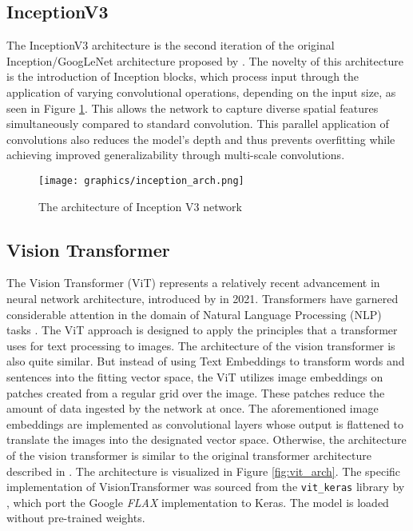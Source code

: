 \documentclass[draft,final]{vutinfth} %
\begin{document}
\subsection{InceptionV3} \label{sec:meth_disease_inception}
The InceptionV3 architecture is the second iteration of the original Inception/GoogLeNet architecture proposed by \citeauthor{szegedy_going_2014} \cite{szegedy_going_2014}. The novelty of this architecture is the introduction of Inception blocks, which process input through the application of varying convolutional operations, depending on the input size, as seen in Figure \ref{fig:inception_arch}. This allows the network to capture diverse spatial features simultaneously compared to standard convolution. This parallel application of convolutions also reduces the model's depth and thus prevents overfitting while achieving improved generalizability through multi-scale convolutions. 

\begin{figure}
    \centering
    \texttt{[image: graphics/inception\_arch.png]}
    \caption{The architecture of Inception V3 network \cite{iparraguirre-villanueva_convolutional_2022}}
    \label{fig:inception_arch}
\end{figure}

\subsection{Vision Transformer} \label{sec:method_vit}
The Vision Transformer (ViT) represents a relatively recent advancement in neural network architecture, introduced by \citeauthor{dosovitskiy_image_2021} in 2021. Transformers have garnered considerable attention in the domain of Natural Language Processing (NLP) tasks \cite{vaswani_attention_2023}. 
The ViT approach is designed to apply the principles that a transformer uses for text processing to images. The architecture of the vision transformer is also quite similar. But instead of using Text Embeddings to transform words and sentences into the fitting vector space, the ViT utilizes image embeddings on patches created from a regular grid over the image. These patches reduce the amount of data ingested by the network at once. The aforementioned image embeddings are implemented as convolutional layers whose output is flattened to translate the images into the designated vector space. Otherwise, the architecture of the vision transformer is similar to the original transformer architecture described in \cite{vaswani_attention_2023} \cite{dosovitskiy_image_2021}. The architecture is visualized in Figure \ref{fig:vit_arch}.
The specific implementation of VisionTransformer was sourced from the \verb|vit_keras| library by \citeauthor{fausto_morales_vit_keras_2020} \cite{fausto_morales_vit_keras_2020}, which port the Google \textit{FLAX} implementation \cite{dosovitskiy_image_2021, tolstikhin_mlp-mixer_2021, steiner_how_2021, chen_when_2021, zhuang_surrogate_2022, zhai_lit_2022} to Keras. The model is loaded without pre-trained weights.
\end{document}
